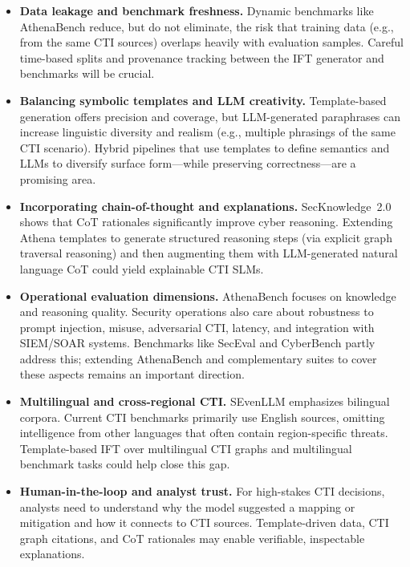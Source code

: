 \documentclass[sigconf]{acmart}
\begin{document}
\begin{itemize}
  \item \textbf{Data leakage and benchmark freshness.} Dynamic benchmarks like AthenaBench reduce, but do not eliminate, the risk that training data (e.g., from the same CTI sources) overlaps heavily with evaluation samples. Careful time-based splits and provenance tracking between the IFT generator and benchmarks will be crucial.\cite{alam2025athenabench,cardei2025ift}
  \item \textbf{Balancing symbolic templates and LLM creativity.} Template-based generation offers precision and coverage, but LLM-generated paraphrases can increase linguistic diversity and realism (e.g., multiple phrasings of the same CTI scenario). Hybrid pipelines that use templates to define semantics and LLMs to diversify surface form---while preserving correctness---are a promising area.
  \item \textbf{Incorporating chain-of-thought and explanations.} SecKnowledge~2.0 shows that CoT rationales significantly improve cyber reasoning.\cite{levi2025toward} Extending Athena templates to generate structured reasoning steps (via explicit graph traversal reasoning) and then augmenting them with LLM-generated natural language CoT could yield explainable CTI SLMs.
  \item \textbf{Operational evaluation dimensions.} AthenaBench focuses on knowledge and reasoning quality. Security operations also care about robustness to prompt injection, misuse, adversarial CTI, latency, and integration with SIEM/SOAR systems. Benchmarks like SecEval and CyberBench partly address this; extending AthenaBench and complementary suites to cover these aspects remains an important direction.\cite{hu2024seceval,liu2024cyberbench,alam2025athenabench}
  \item \textbf{Multilingual and cross-regional CTI.} SEvenLLM emphasizes bilingual corpora.\cite{ji2024sevenllm} Current CTI benchmarks primarily use English sources, omitting intelligence from other languages that often contain region-specific threats. Template-based IFT over multilingual CTI graphs and multilingual benchmark tasks could help close this gap.
  \item \textbf{Human-in-the-loop and analyst trust.} For high-stakes CTI decisions, analysts need to understand why the model suggested a mapping or mitigation and how it connects to CTI sources. Template-driven data, CTI graph citations, and CoT rationales may enable verifiable, inspectable explanations.
\end{itemize}
\end{document}
